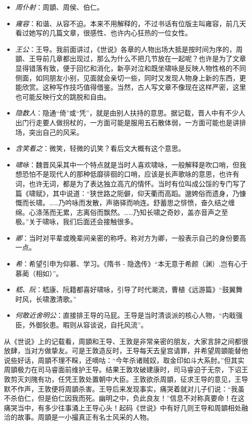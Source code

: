 \documentclass[]{book}
\providecommand{\tightlist}{%
  \setlength{\itemsep}{0pt}\setlength{\parskip}{0pt}}
\begin{document}
\begin{itemize}
\tightlist
\item
  \emph{周仆射}：周顗、周侯、伯仁。
\item
  \emph{雍容}：和谐、从容不迫。本来不用解释的，不过书话有位版主叫雍容，前几天看过她写的几篇文章，很感性、也许内心狂热的一位女性。
\item
  \emph{王公}：王导。我前面讲过，《世说》各章的人物出场大抵是按时间为序的，周顗、王导前几章都出现过，那么为什么不把几节放在一起呢？也许是为了文章显得错落有致，便于回忆和消化，新亭对泣和既坐啸咏是反映人物性格的不同侧面，如同朋友小别，见面就会亲切一些，同时又发现人物身上新的东西，更能欣赏。这种写作技巧值得借鉴。当然，古人写文章不像现在这样严密，这里也可能反映行文的跳脱和自由。
\item
  \emph{隐数人}：隐通``倚''或``凭''，就是由别人扶持的意思。据记载，晋人中有不少人出门行走要人做拐杖的，一方面可能是服用五石散体弱，一方面可能也是讲排场，突出自己的风采。
\item
  \emph{含笑看之}：微笑，轻微的讥笑？看后文大概有这个意思。
\item
  \emph{啸咏}：魏晋风采其中一个特点就是当时人喜欢啸咏，一般解释是吹口哨，但我想恐怕不是现代人的那种低靡徘徊的口哨，应该是长声歌咏的意思，也许有词，也许无词，都是为了表达独立高亢的情怀。当时有位叫成公馁的专门写了篇《啸赋》，其中说道：``狭世路之阨僻，仰天衢而高蹈。邈姱俗而遗身，乃慷慨而长啸。\ldots{}\ldots{}乃吟咏而发散，声骆驿而响连。舒蓄思之悱愤，奋久结之缠绵。心涤荡而无累，志离俗而飘然。\ldots{}\ldots{}乃知长啸之奇妙，盖亦音声之至极。''关于啸咏，我们后面还会接触很多。
\item
  \emph{卿}：当时对平辈或晚辈间亲密的称呼。称对方为卿，一般表示自己的身份要高一点。
\item
  \emph{希}：希望引申为仰慕、学习。《隋书 -
  隐逸传》``本无意于希颜（渊）,岂有心于慕蔺（相如）''。
\item
  \emph{嵇、阮}：嵇康、阮籍都喜好啸咏，引导了时代潮流，曹植《远游篇》``鼓翼舞时风，长啸激清歌。''
\item
  \emph{何敢近舍明公}：直接排王导的马屁。王导是当时清谈派的核心人物，``内戢强臣，外御狄患。暇则从容谈说，自托风流''。
\end{itemize}

从《世说》上的记载看，周顗和王导、王敦是非常亲密的朋友，大家言辞之间都很放肆，当对方做挚友。可是王敦造反时，王导每天去皇宫请罪，并希望周顗能替他说些好话，周顗不理不睬，还嘀咕：``今年杀诸贼奴，取金印如斗大系肘。''但其实周顗极力在司马睿面前维护王导。结果王敦攻破建康时，司马睿迫于无奈，下诏王敦剪灭刘隗有功，任凭王敦处置朝中大臣。王敦欲杀周顗，征求王导的意见，王导默不作声，王敦便将周顗杀害。王导后来发现事实，痛哭着就对儿子们说：``我虽不杀伯仁，但是伯仁因我而死。幽明之中，负此良友！''信息不对称真要命！在这痛哭当中，有多少往事涌上王导心头！起码《世说》中有好几则王导和周顗相处融洽的故事。周顗是一小撮真正有名士风采的人物。
\end{document}
